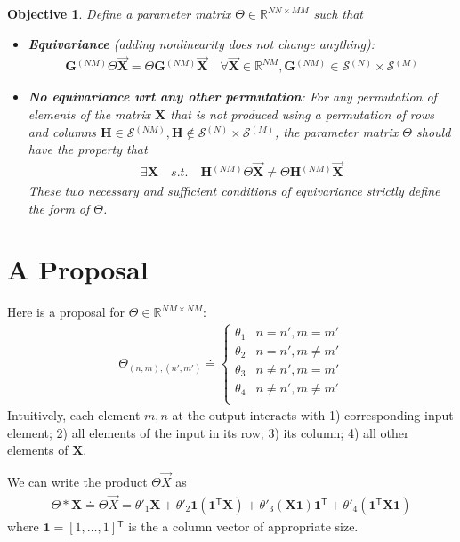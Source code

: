 \documentclass{article}
\newcommand{\defeq}{\ensuremath{\doteq}}
\newcommand{\mat}[1]{\ensuremath{\mathbf{#1}}}
\newcommand{\gr}[1]{\ensuremath{\mathcal{#1}}}
\newcommand{\set}[1]{\ensuremath{\mathbb{#1}}}
\renewcommand{\vec}[1]{\ensuremath{\overrightarrow{#1}}}
\newcommand{\prm}[1]{\ensuremath{^{(#1)}}}
\newcommand{\grn}[2]{\ensuremath{\gr{#1}\prm{#2}}}
\newcommand{\Trp}[0]{\ensuremath{^{\mathsf{T}}}}
\newcommand{\XX}[0]{\ensuremath{\mat{X}}}
\renewcommand{\Re}[0]{\ensuremath{\set{R}}}
\newtheorem{objective}[theorem]{Objective}
\theoremstyle{definition}
\begin{document}
\begin{objective}\label{obj:1}
  Define a parameter matrix $\Theta \in \Re^{ N N \times M M}$ such that
  \begin{itemize}
  \item \textbf{Equivariance} (adding nonlinearity does not change anything):
  \begin{align}
    \mat{G}\prm{N M} \Theta \vec{\XX} = \Theta \mat{G}\prm{N M} \vec{\XX}\quad \forall \vec{\XX} \in \Re^{N M}, \mat{G}\prm{N M} \in \grn{S}{N} \times \grn{S}{M}
  \end{align}
\item \textbf{No equivariance wrt any other permutation}:
  For any permutation of elements of the matrix $\XX$ that is not produced using a permutation of rows and columns $\mat{H} \in \grn{S}{N M}, \mat{H} \notin \grn{S}{N} \times \grn{S}{M}$, the
  parameter matrix $\Theta$ should have the property that
  \begin{align}
   \exists \XX \quad s.t. \quad  \mat{H}\prm{N M} \Theta \vec{\XX} \neq \Theta \mat{H}\prm{N M} \vec{\XX} 
  \end{align}
  These two necessary and sufficient conditions of equivariance strictly define the form of $\Theta$.
\end{itemize}
\end{objective}


\section{A Proposal}
Here is a proposal for $\Theta \in \Re^{NM \times NM}$:
\begin{align}
  \Theta_{(n,m), (n',m')} \defeq
  \begin{cases}
    \theta_1 & n = n', m = m'\\
    \theta_2 & n = n', m \neq m' \\
    \theta_3 & n \neq n', m = m' \\
    \theta_4 & n \neq n', m \neq m' \\
  \end{cases}
\end{align}
Intuitively, each element ${m,n}$ at the output interacts with 1) corresponding input element; 2) all elements of the input in its row; 3) its column; 4) all other elements of $\XX$.

We can write the product $\Theta \vec{X}$ as
\begin{align}\label{eq:param}
  \Theta * \XX \defeq \Theta \vec{X} = \theta'_1 \XX +  \theta'_2 \mat{1} (\mat{1}\Trp \XX) + \theta'_3 (\XX \mat{1})\mat{1}\Trp + \theta'_4 (\mat{1}\Trp \XX \mat{1})
\end{align}
where $\mat{1} = [1,\ldots,1]\Trp$ is the a column vector of appropriate size.
\end{document}
